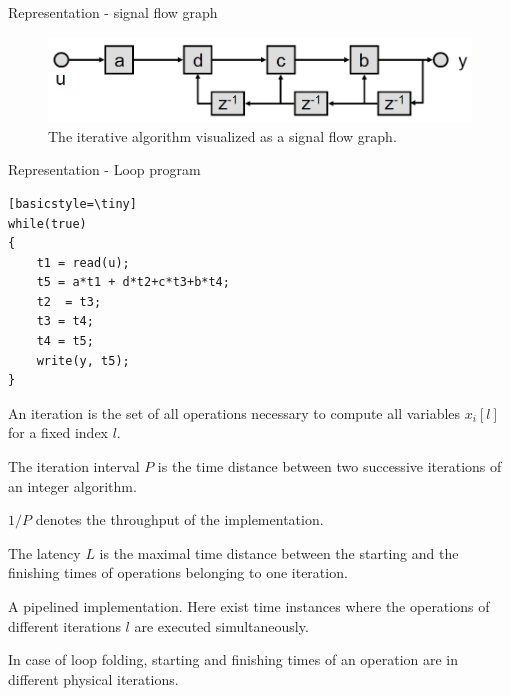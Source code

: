 Representation - signal flow graph

\begin{figure}[ht]
	\centering
  	\includegraphics[scale=0.4]{img/11_iterativ_as_signal.png}
	\caption{The iterative algorithm visualized as a signal flow graph.}
	\label{fig:iterative_as_signal}
\end{figure}

Representation - Loop program


\begin{lstlisting}[mathescape][basicstyle=\tiny]
while(true)
{
	t1 = read(u);
	t5 = a*t1 + d*t2+c*t3+b*t4;
	t2  = t3;
	t3 = t4;
	t4 = t5;
	write(y, t5);
}
\end{lstlisting}


\begin{definition}[Iteration]
An iteration is the set of all operations necessary to compute all variables $x_i[l]$ for a fixed index $l$.
\end{definition}

\begin{definition}
The iteration interval $P$ is the time distance between two successive iterations of an integer algorithm.
\end{definition}

\begin{definition}[Throughput]
$1/P$ denotes the throughput of the implementation.
\end{definition}

\begin{definition}[Latency]
The latency $L$ is the maximal time distance between the starting and the finishing times of operations belonging to one iteration.
\end{definition}

\begin{definition}
A pipelined implementation. Here exist time instances where the operations of different iterations $l$ are executed simultaneously.
\end{definition}

\begin{definition}
In case of loop folding, starting and finishing times of an operation are in different physical iterations.
\end{definition}


